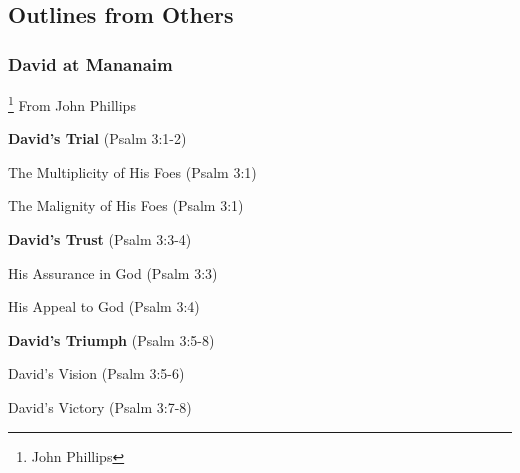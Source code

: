 \subsection{Outlines from Others}

\subsubsection{David at Mananaim}\footnote{John Phillips}
From John Phillips\cite{Phillips2001ExploringPsalms1}
\begin{compactenum}[I.]
    \item \textbf{David's Trial} (Psalm 3:1-2)
    \begin{compactenum}[A.]
        \item The Multiplicity of His Foes (Psalm 3:1)
        \item The Malignity of His Foes (Psalm 3:1)
    \end{compactenum}
    \item \textbf{David's Trust} (Psalm 3:3-4)
    \begin{compactenum}[A.]
        \item His Assurance in God (Psalm 3:3)
        \item His Appeal to God (Psalm 3:4)
    \end{compactenum}
    \item \textbf{David's Triumph} (Psalm 3:5-8)
    \begin{compactenum}[A.]
        \item David's Vision (Psalm 3:5-6)
        \item David's Victory (Psalm 3:7-8)
    \end{compactenum}
\end{compactenum}
\newpage


